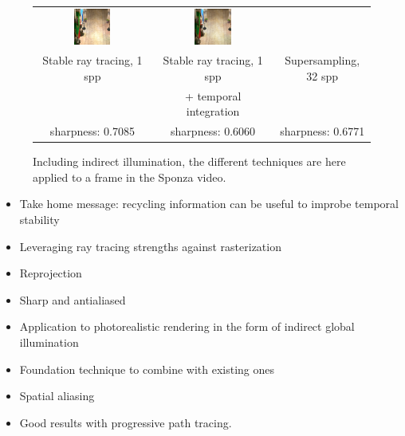\begin{figure}
\begin{tabular}{@{}c@{}c@{}@{}c@{}}
	 	 \includegraphics[width=0.33\textwidth]{figures/srt_1_ti_rect_370_300_300_300_frame_211.png} &
	  \includegraphics[width=0.33\textwidth]{figures/ss_32x_rect_370_300_300_300_frame_211.png}
 \\
Stable ray tracing, 1 spp & Stable ray tracing, 1 spp & Supersampling, 32 spp \\
 & + temporal integration &  \\
sharpness: 0.7085 & sharpness: 0.6060 & sharpness: 0.6771 \\[-1.5ex]
\end{tabular}
\caption{Including indirect illumination, the different techniques are here applied to a frame in the Sponza video.}
\label{fig:sponza_video_frame}
\end{figure}


\begin{itemize}
\item Take home message: recycling information can be useful to improbe temporal stability 
\item Leveraging ray tracing strengths against rasterization
\item Reprojection 
\item Sharp and antialiased
\item Application to photorealistic rendering in the form of indirect global illumination
\item Foundation technique to combine with existing ones
\item Spatial aliasing
\item Good results with progressive path tracing.
\end{itemize}

